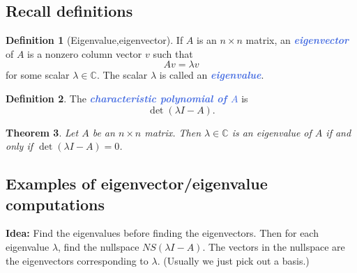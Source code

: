 \documentclass[10pt]{article}
\newcommand{\demph}[1]{\textcolor{RoyalBlue}{\textbf{\slshape #1}}} %
\newtheorem{theorem}{Theorem}
\theoremstyle{definition}
\newtheorem{definition}[theorem]{Definition}
\newcommand{\Fl}[1]{\vspace{5mm}\noindent\textbf{#1}}%
\newcommand{\C}{\mathbb{C}}           %
\begin{document}
\subsection{Recall definitions}



\begin{definition}[Eigenvalue,eigenvector]
  \label{def:eigenvalue-eigenvector}
  If $A$ is an $n\times n$ matrix, an \demph{eigenvector} of $A$ is a nonzero
  column vector $v$ such that
  \begin{equation*}
    Av=\lambda v
  \end{equation*}
  for some scalar $\lambda\in \C$. The scalar $\lambda$ is called an \demph{eigenvalue}.
\end{definition}


\begin{definition}
  The \demph{characteristic polynomial of $A$ } is
  \begin{equation*}
    \det(\lambda I-A).
  \end{equation*}
\end{definition}

\begin{theorem}
  Let $A$ be an $n\times n$ matrix. Then $\lambda\in \C$ is an eigenvalue of
  $A$ if and only if $\det(\lambda I-A)=0$.
\end{theorem}




\subsection{Examples of eigenvector/eigenvalue computations}

\Fl{Idea:} Find the eigenvalues before finding the eigenvectors. Then for each
eigenvalue $\lambda$, find the nullspace $NS(\lambda I-A)$. The vectors in the
nullspace are the eigenvectors corresponding to $\lambda$. (Usually we just
pick out a basis.)
\end{document}
